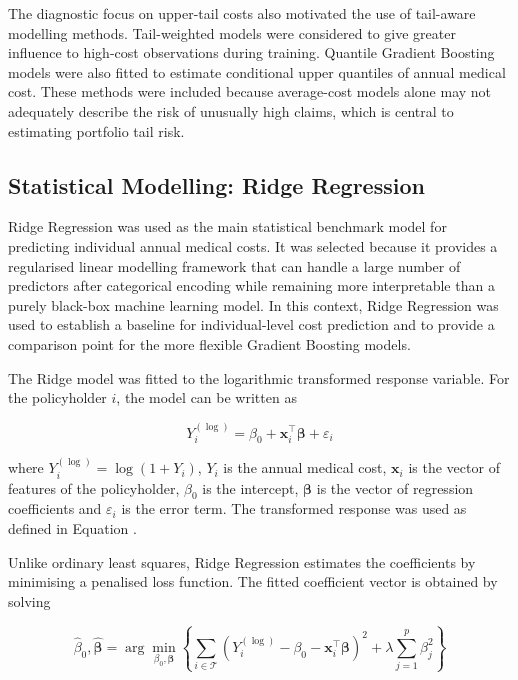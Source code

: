 	The diagnostic focus on upper-tail costs also motivated the use of tail-aware modelling methods. Tail-weighted models were considered to give greater influence to high-cost observations during training. Quantile Gradient Boosting models were also fitted to estimate conditional upper quantiles of annual medical cost. These methods were included because average-cost models alone may not adequately describe the risk of unusually high claims, which is central to estimating portfolio tail risk.
	
	\subsection{Statistical Modelling: Ridge Regression}
	
	Ridge Regression was used as the main statistical benchmark model for predicting individual annual medical costs. It was selected because it provides a regularised linear modelling framework that can handle a large number of predictors after categorical encoding while remaining more interpretable than a purely black-box machine learning model. In this context, Ridge Regression was used to establish a baseline for individual-level cost prediction and to provide a comparison point for the more flexible Gradient Boosting models.
	
	The Ridge model was fitted to the logarithmic transformed response variable. For the policyholder \(i\), the model can be written as
	
	\begin{equation}
		Y_i^{(\log)} = \beta_0 + \mathbf{x}_i^{\top}\boldsymbol{\beta} + \varepsilon_i
	\end{equation}
	
	where \(Y_i^{(\log)} = \log(1 + Y_i)\), \(Y_i\) is the annual medical cost, \(\mathbf{x}_i\) is the vector of features of the policyholder, \(\beta_0\) is the intercept, \(\boldsymbol{\beta}\) is the vector of regression coefficients and \(\varepsilon_i\) is the error term. The transformed response was used as defined in Equation .
	
	Unlike ordinary least squares, Ridge Regression estimates the coefficients by minimising a penalised loss function. The fitted coefficient vector is obtained by solving
	
	\begin{equation}
		\hat{\beta}_0, \hat{\boldsymbol{\beta}}
		=
		\arg\min_{\beta_0, \boldsymbol{\beta}}
		\left\{
		\sum_{i \in \mathcal{T}}
		\left(
		Y_i^{(\log)} - \beta_0 - \mathbf{x}_i^{\top}\boldsymbol{\beta}
		\right)^2
		+
		\lambda
		\sum_{j=1}^{p}
		\beta_j^2
		\right\}
	\end{equation}
	
